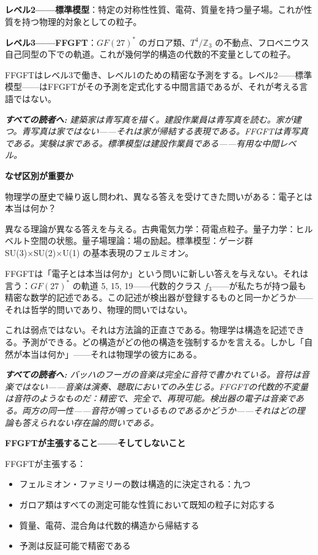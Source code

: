 \documentclass[11pt,openany]{book}
\newenvironment{laierspur}{%
  \par\vspace{4pt}%
  \noindent\small\itshape\color{blue!60!black}%
  \textbf{すべての読者へ:}\enspace\ignorespaces}{%
  \par\vspace{4pt}\normalsize\normalfont\normalcolor}
\begin{document}
\textbf{レベル2——標準模型}：特定の対称性性質、電荷、質量を持つ量子場。これが性質を持つ物理的対象としての粒子。

\textbf{レベル3——FFGFT}：$GF(27)^*$ のガロア類、$T^4/\mathbb{Z}_3$ の不動点、フロベニウス自己同型の下での軌道。これが幾何学的構造の代数的不変量としての粒子。

FFGFTはレベル3で働き、レベル1のための精密な予測をする。レベル2——標準模型——はFFGFTがその予測を定式化する中間言語であるが、それが考える言語ではない。

\begin{laierspur}
建築家は青写真を描く。建設作業員は青写真を読む。家が建つ。青写真は家ではない——それは家が帰結する表現である。FFGFTは青写真である。実験は家である。標準模型は建設作業員である——有用な中間レベル。
\end{laierspur}

\textbf{なぜ区別が重要か}

物理学の歴史で繰り返し問われ、異なる答えを受けてきた問いがある：電子とは本当は何か？

異なる理論が異なる答えを与える。古典電気力学：荷電点粒子。量子力学：ヒルベルト空間の状態。量子場理論：場の励起。標準模型：ゲージ群 SU(3)×SU(2)×U(1) の基本表現のフェルミオン。

FFGFTは「電子とは本当は何か」という問いに新しい答えを与えない。それは言う：$GF(27)^*$ の軌道 {5, 15, 19}——代数的クラス $f_3$——が私たちが持つ最も精密な数学的記述である。この記述が検出器が登録するものと同一かどうか——それは哲学的問いであり、物理的問いではない。

これは弱点ではない。それは方法論的正直さである。物理学は構造を記述できる。予測ができる。どの構造がどの他の構造を強制するかを言える。しかし「自然が本当は何か」——それは物理学の彼方にある。

\begin{laierspur}
バッハのフーガの音楽は完全に音符で書かれている。音符は音楽ではない——音楽は演奏、聴取においてのみ生じる。FFGFTの代数的不変量は音符のようなものだ：精密で、完全で、再現可能。検出器の電子は音楽である。両方の同一性——音符が鳴っているものであるかどうか——それはどの理論も答えられない存在論的問いである。
\end{laierspur}

\textbf{FFGFTが主張すること——そしてしないこと}

FFGFTが主張する：
\begin{itemize}
\item フェルミオン・ファミリーの数は構造的に決定される：九つ
\item ガロア類はすべての測定可能な性質において既知の粒子に対応する
\item 質量、電荷、混合角は代数的構造から帰結する
\item 予測は反証可能で精密である
\end{itemize}
\end{document}
